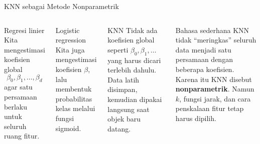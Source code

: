 \documentclass[aspectratio=169,11pt]{beamer}
\begin{document}
\begin{frame}{KNN sebagai Metode Nonparametrik}
\begin{columns}[T]
\begin{block}{Regresi linier}
\small
Kita mengestimasi koefisien global
\[
\beta_0,\beta_1,\ldots,\beta_d
\]
agar satu persamaan berlaku untuk seluruh ruang fitur.
\end{block}
\begin{block}{Logistic regression}
\small
Kita juga mengestimasi koefisien $\beta$, lalu membentuk probabilitas kelas melalui fungsi sigmoid.
\end{block}
\begin{block}{KNN}
\small
Tidak ada koefisien global seperti $\beta_0,\beta_1,\ldots$ yang harus dicari terlebih dahulu. Data latih disimpan, kemudian dipakai langsung saat objek baru datang.
\end{block}
\begin{alertblock}{Bahasa sederhana}
\small
KNN tidak ``meringkas'' seluruh data menjadi satu persamaan dengan beberapa koefisien. Karena itu KNN disebut \textbf{nonparametrik}. Namun $k$, fungsi jarak, dan cara penskalaan fitur tetap harus dipilih.
\end{alertblock}
\end{columns}
\end{frame}
\end{document}
